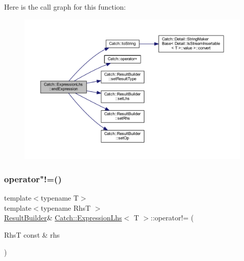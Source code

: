 Here is the call graph for this function\+:\nopagebreak
\begin{figure}[H]
\begin{center}
\leavevmode
\includegraphics[width=350pt]{class_catch_1_1_expression_lhs_a13d2551a927790284fb5ddf1ee2c9079_cgraph}
\end{center}
\end{figure}
\hypertarget{class_catch_1_1_expression_lhs_a44df9974cf20fcfda4e5b6b3c01d5f93}{}\label{class_catch_1_1_expression_lhs_a44df9974cf20fcfda4e5b6b3c01d5f93} 
\subsubsection{\texorpdfstring{operator"!=()}{operator!=()}\hspace{0.1cm}{\footnotesize\ttfamily [1/2]}}
{\footnotesize\ttfamily template$<$typename T$>$ \\
template$<$typename RhsT $>$ \\
\hyperlink{class_catch_1_1_result_builder}{Result\+Builder}\& \hyperlink{class_catch_1_1_expression_lhs}{Catch\+::\+Expression\+Lhs}$<$ T $>$\+::operator!= (\begin{DoxyParamCaption}\item[{RhsT const \&}]{rhs }\end{DoxyParamCaption})\hspace{0.3cm}{\ttfamily [inline]}}

\hypertarget{class_catch_1_1_expression_lhs_a71e48da9a894962e8b32a8af5359a4df}{}\label{class_catch_1_1_expression_lhs_a71e48da9a894962e8b32a8af5359a4df} 
